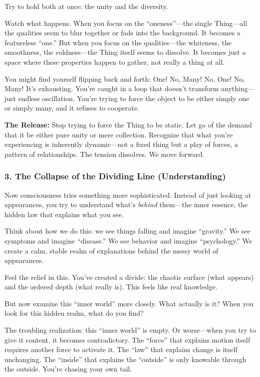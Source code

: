 Try to hold both at once: the unity and the diversity.

Watch what happens. When you focus on the ``oneness''---the single Thing---all the qualities seem to blur together or fade into the background. It becomes a featureless ``one.'' But when you focus on the qualities---the whiteness, the smoothness, the coldness---the Thing itself seems to dissolve. It becomes just a space where these properties happen to gather, not really a thing at all.

You might find yourself flipping back and forth: One! No, Many! No, One! No, Many! It's exhausting. You're caught in a loop that doesn't transform anything---just endless oscillation. You're trying to force the object to be either simply one or simply many, and it refuses to cooperate.

\textbf{The Release:} Stop trying to force the Thing to be static. Let go of the demand that it be either pure unity or mere collection. Recognize that what you're experiencing is inherently dynamic---not a fixed thing but a play of forces, a pattern of relationships. The tension dissolves. We move forward.

\subsubsection{3. The Collapse of the Dividing Line (Understanding)}\label{the-collapse-of-the-dividing-line-understanding}

Now consciousness tries something more sophisticated. Instead of just looking at appearances, you try to understand what's \emph{behind} them---the inner essence, the hidden law that explains what you see.

Think about how we do this: we see things falling and imagine ``gravity.'' We see symptoms and imagine ``disease.'' We see behavior and imagine ``psychology.'' We create a calm, stable realm of explanations behind the messy world of appearances.

Feel the relief in this. You've created a divide: the chaotic surface (what appears) and the ordered depth (what really is). This feels like real knowledge.

But now examine this ``inner world'' more closely. What actually is it? When you look for this hidden realm, what do you find?

The troubling realization: this ``inner world'' is empty. Or worse---when you try to give it content, it becomes contradictory. The ``force'' that explains motion itself requires another force to activate it. The ``law'' that explains change is itself unchanging. The ``inside'' that explains the ``outside'' is only knowable through the outside. You're chasing your own tail.

